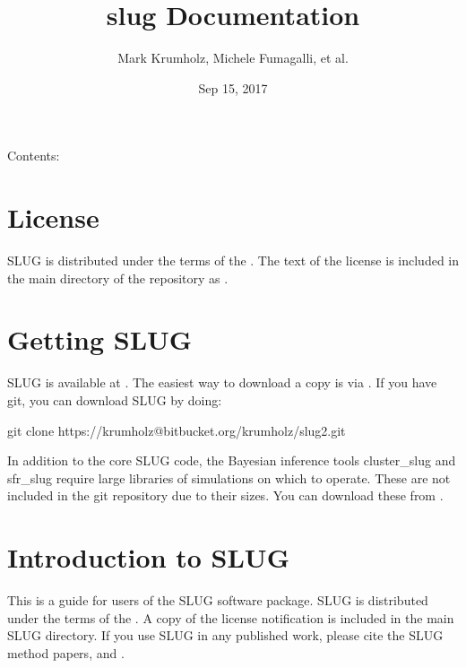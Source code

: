 \documentclass[letterpaper,10pt,english]{sphinxmanual}
\title{slug Documentation}
\date{Sep 15, 2017}
\author{Mark Krumholz, Michele Fumagalli, et al.}
\begin{document}
\maketitle
\sphinxtableofcontents
{}\label{\detokenize{index::doc}}


Contents:


\chapter{License}
\label{\detokenize{license::doc}}\label{\detokenize{license:welcome-to-slug-s-documentation}}\label{\detokenize{license:license}}
SLUG is distributed under the terms of the . The text of the license is included in the main directory of the repository as .


\chapter{Getting SLUG}
\label{\detokenize{getting:getting-slug}}\label{\detokenize{getting::doc}}
SLUG is available at . The easiest way to download a copy is via . If you have git, you can download SLUG by doing:

\begin{sphinxVerbatim}[commandchars=\\\{\}]
git clone https://krumholz@bitbucket.org/krumholz/slug2.git
\end{sphinxVerbatim}

In addition to the core SLUG code, the Bayesian inference tools cluster\_slug and sfr\_slug require large libraries of simulations on which to operate. These are not included in the git repository due to their sizes. You can download these from .


\chapter{Introduction to SLUG}
\label{\detokenize{intro:introduction-to-slug}}\label{\detokenize{intro::doc}}
This is a guide for users of the SLUG software package. SLUG is distributed under the terms of the . A copy of the license notification is included in the main SLUG directory. If you use SLUG in any published work, please cite the SLUG method papers,  and .
\end{document}
